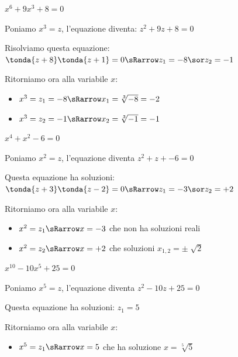 \begin{esempio}
  $x^6+9x^3+8=0$

  Poniamo $x^3=z$, l'equazione diventa: $z^2+9z+8=0$

  Risolviamo questa equazione: 
  $\tonda{z+8}\tonda{z+1}=0 \sRarrow z_1=-8 \sor z_2=-1$

  Ritorniamo ora alla variabile $x$:
  \begin{itemize} [nosep]
    \item $x^3=z_1=-8 \sRarrow x_1=\sqrt[3]{-8}=-2$ 
    \item $x^3=z_2=-1 \sRarrow x_2=\sqrt[3]{-1}=-1$
  \end{itemize}
\end{esempio}

\begin{esempio}
  $x^4+x^2-6=0$
  
  Poniamo $x^2=z$, l'equazione diventa $z^2+z+-6=0$ 
  
  Questa equazione ha soluzioni:
  $\tonda{z+3}\tonda{z-2}=0 \sRarrow z_1=-3 \sor z_2=+2$
  
  Ritorniamo ora alla variabile $x$:
  \begin{itemize} [nosep]
    \item $x^2=z_1 \sRarrow x=-3$ che non ha soluzioni reali
    \item $x^2=z_2 \sRarrow x=+2$ che soluzioni $x_{1,2}=\pm \sqrt[]{2}$
  \end{itemize}
\end{esempio}

\begin{esempio}
  $x^{10}-10x^5+25=0$ 
  
  Poniamo $x^5=z$, l'equazione diventa $z^2-10z+25=0$
  
  Questa equazione ha soluzioni:
  $z_1=5$
  
  Ritorniamo ora alla variabile $x$:
  \begin{itemize} [nosep]
    \item $x^5=z_1 \sRarrow x=5$ che ha soluzione $x=\sqrt[5]{5}$
  \end{itemize}
\end{esempio}


